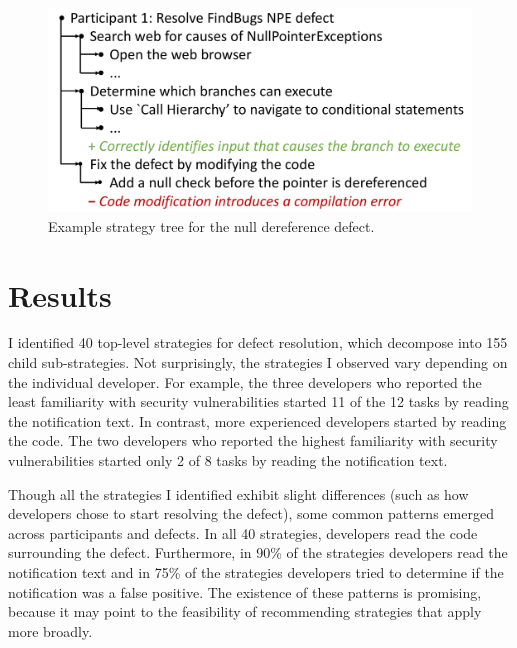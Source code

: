 \documentclass{sig-alternate}
\begin{document}
\begin{figure}
	\centering
	\includegraphics[width=\columnwidth]{"images/strategy description format"}
	\caption{Example strategy tree for the null dereference defect. }
	\label{fig:description} 

\end{figure}




%



\section{Results}
I identified 40 top-level strategies for defect resolution, which decompose into 155 child sub-strategies. 
Not surprisingly, the strategies I observed vary depending on the individual developer.
For example, the three developers who reported the least familiarity with security vulnerabilities started 11 of the 12 tasks by reading the notification text.
In contrast, more experienced developers started by reading the code.
The two developers who reported the highest familiarity with security vulnerabilities started only 2 of 8 tasks by reading the notification text. 

Though all the strategies I identified exhibit slight differences (such as how developers chose to start resolving the defect), some common patterns emerged across participants and defects. 
In all 40 strategies, developers read the code surrounding the defect. Furthermore, in 90\% of the strategies developers read the notification text and in 75\% of the strategies developers tried to determine if the notification was a false positive.
The existence of these patterns is promising, because it may point to the feasibility of recommending strategies that apply more broadly. 
\end{document}
